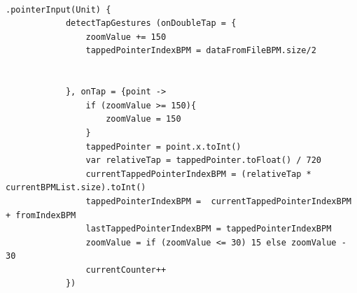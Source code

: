 {{	\mbox{}\\
	
	\begin{lstlisting}[label={fig:simpleSourceGen.cs}, caption={Code for zooming in and zooming out via tap/double tap}]
		.pointerInput(Unit) {
			detectTapGestures (onDoubleTap = {
				zoomValue += 150
				tappedPointerIndexBPM = dataFromFileBPM.size/2
				
				
			}, onTap = {point ->
				if (zoomValue >= 150){
					zoomValue = 150
				}
				tappedPointer = point.x.toInt()
				var relativeTap = tappedPointer.toFloat() / 720
				currentTappedPointerIndexBPM = (relativeTap * currentBPMList.size).toInt() 
				tappedPointerIndexBPM =  currentTappedPointerIndexBPM + fromIndexBPM 
				lastTappedPointerIndexBPM = tappedPointerIndexBPM
				zoomValue = if (zoomValue <= 30) 15 else zoomValue - 30
				currentCounter++
			})
			
		\end{lstlisting}
	
	
	
	
	
	
	
}}
